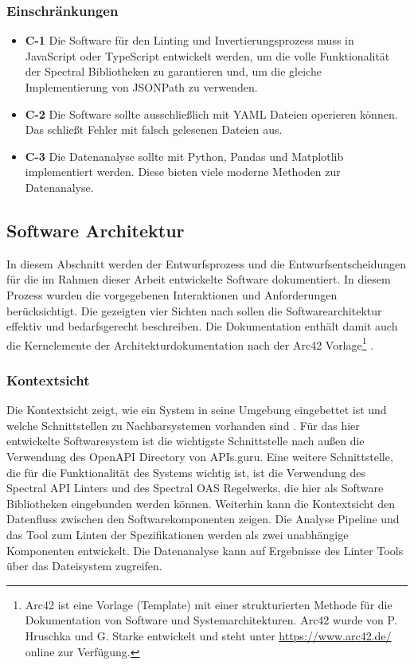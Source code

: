 \subsubsection{Einschränkungen} \label{sec:einschränkungen}
\begin{itemize}
  \item \textbf{C-1} Die Software für den Linting und Invertierungsprozess muss in JavaScript oder TypeScript entwickelt werden, um die volle Funktionalität der Spectral Bibliotheken zu garantieren und, um die gleiche Implementierung von JSONPath zu verwenden.
  \item \textbf{C-2} Die Software sollte ausschließlich mit \acs{YAML} Dateien operieren können. Das schließt Fehler mit falsch gelesenen Dateien aus.
  \item \textbf{C-3} Die Datenanalyse sollte mit Python, Pandas und Matplotlib implementiert werden. Diese bieten viele moderne Methoden zur Datenanalyse.
\end{itemize}


\subsection{Software Architektur} \label{sec:softwarearchitektur}
In diesem Abschnitt werden der Entwurfsprozess und die Entwurfsentscheidungen für die im Rahmen dieser Arbeit entwickelte Software dokumentiert. In diesem Prozess wurden die vorgegebenen Interaktionen und Anforderungen berücksichtigt. Die gezeigten vier Sichten nach \parencite{starke_effektive_2024} sollen die Softwarearchitektur effektiv und bedarfsgerecht beschreiben. Die Dokumentation enthält damit auch die Kernelemente der Architekturdokumentation nach der Arc42 Vorlage\footnote{Arc42 ist eine Vorlage (Template) mit einer strukturierten Methode für die Dokumentation von Software und Systemarchitekturen. Arc42 wurde von P. Hruschka und G. Starke entwickelt und steht unter \href{https://www.arc42.de/}{https://www.arc42.de/} online zur Verfügung.} \parencite{starke_arc42_2024}.


\subsubsection{Kontextsicht} \label{sec:kontextsicht}
Die Kontextsicht zeigt, wie ein System in seine Umgebung eingebettet ist und welche Schnittstellen zu Nachbarsystemen vorhanden sind \parencite{starke_effektive_2024}. Für das hier entwickelte Softwaresystem ist die wichtigste Schnittstelle nach außen die Verwendung des OpenAPI Directory von APIs.guru. Eine weitere Schnittstelle, die für die Funktionalität des Systems wichtig ist, ist die Verwendung des Spectral \acs{API} Linters und des Spectral OAS Regelwerks, die hier als Software Bibliotheken eingebunden werden können. Weiterhin kann die Kontextsicht den Datenfluss zwischen den Softwarekomponenten zeigen. Die Analyse Pipeline und das Tool zum Linten der Spezifikationen werden als zwei unabhängige Komponenten entwickelt. Die Datenanalyse kann auf Ergebnisse des Linter Tools über das Dateisystem zugreifen.

